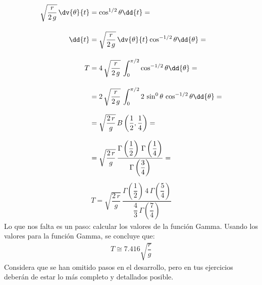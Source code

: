 \begin{align*}
\sqrt{\dfrac{r}{2 \, g}} \, \dv{\theta}{t} &= \cos^{1/2} \theta \dd{t} = \\[1em]
\dd{t} &= \sqrt{\dfrac{r}{2 \, g}} \, \dv{\theta}{t} \cos^{-1/2} \theta \dd{\theta} = \\[1em]
T &= 4 \, \sqrt{\dfrac{r}{2 \, g}} \, \int_{0}^{\pi/2} \cos^{-1/2} \theta \dd{\theta} = \\[1em]
&= 2 \, \sqrt{\dfrac{r}{2 \, g}} \, \int_{0}^{\pi/2} 2 \, \sin^{0} \theta \, \cos^{-1/2} \theta \dd{\theta} = \\[0.8em]
&= \sqrt{\dfrac{2 \, r}{g}} \, B \left( \dfrac{1}{2}, \dfrac{1}{4} \right) = \\[0.8em]
&= \sqrt{\dfrac{2 \, r}{g}} \, \dfrac{\Gamma \left(\dfrac{1}{2} \right) \, \Gamma \left(\dfrac{1}{4} \right)}{\Gamma \left(\dfrac{3}{4} \right)} = 
\end{align*}
\endgroup
\begin{align*}
T = \sqrt{\dfrac{2 \, r}{g}} \, \dfrac{\Gamma \left(\dfrac{1}{2} \right) \, 4 \, \Gamma \left(\dfrac{5}{4} \right)}{\dfrac{4}{3} \, \Gamma \left(\dfrac{7}{4} \right)}
\end{align*}
Lo que nos falta es un paso: calcular los valores de la función Gamma. Usando los valores para la función Gamma, se concluye que:
\begin{align*}
T \cong 7.416 \sqrt{\dfrac{r}{g}}
\end{align*}
Considera que se han omitido pasos en el desarrollo, pero en tus ejercicios deberán de estar lo más completo y detallados posible.



